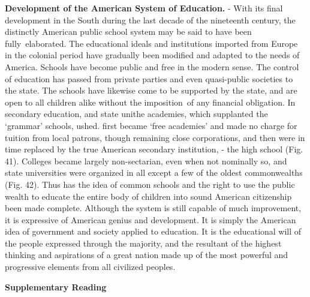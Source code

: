 \documentclass[]{book}
\begin{document}
\textbf{Development of the American System of Education.} - With its final development in the South during the last decade of the nineteenth century, the distinctly American public school system may be said to have been fully~elaborated. The educational ideals and institutions imported from Europe in the colonial period have gradually been modified and adapted to the needs of America. Schools have become public and free in the modern sense. The control of education has passed from private parties and even quasi-public societies to the state. The schools have likewise come to be supported by the state, and are open to all children alike without the imposition~of any financial obligation. In secondary education, and state unithe academies, which supplanted the `grammar' schools, ushed. first became `free academies' and made no charge for tuition from local patrons, though remaining close corporations, and then were in time replaced by the true American secondary institution, - the high school (Fig. 41). Colleges became largely non-sectarian, even when not nominally so, and state universities were organized in all except a few of the oldest commonwealths (Fig. 42). Thus has the idea of common schools and the right to use the public wealth to educate the entire body of children into sound American citizenship been made complete. Although the system is still capable of much improvement, it is expressive of American genius and development. It is simply the American idea of government and society applied to education. It is the educational will of the people expressed through the majority, and the resultant of the highest thinking and aspirations of a great nation made up of the most powerful and progressive elements from all civilized peoples.

\textbf{Supplementary Reading}
\end{document}

